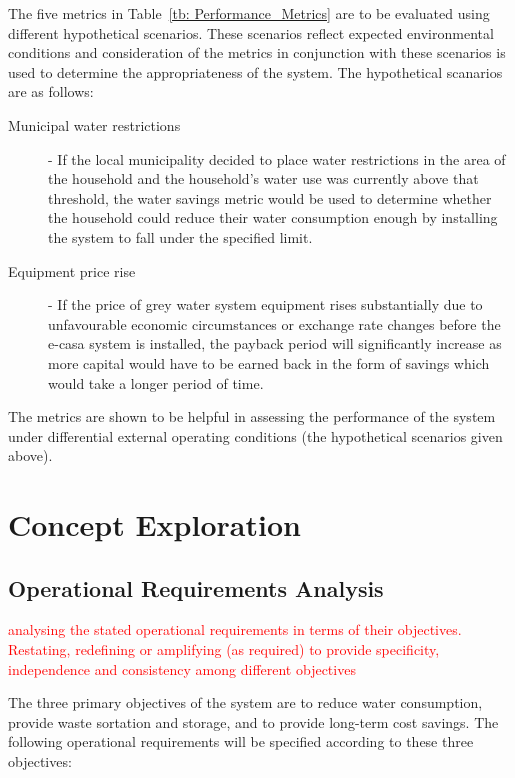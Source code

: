 \documentclass[a4paper,11pt,fleqn]{report}
\begin{document}
The five metrics in Table~\ref{tb: Performance_Metrics} are to be evaluated using different hypothetical scenarios. These scenarios reflect expected environmental conditions and consideration of the metrics in conjunction with these scenarios is used to determine the appropriateness of the system. The hypothetical scanarios are as follows:
%
\begin{description}
	\item[Municipal water restrictions] - If the local municipality decided to place water restrictions in the area of the household and the household's water use was currently above that threshold, the water savings metric would be used to determine whether the household could reduce their water consumption enough by installing the system to fall under the specified limit.
	\item[Equipment price rise] - If the price of grey water system equipment rises substantially due to unfavourable economic circumstances or exchange rate changes before the \ac{e-casa} system is installed, the payback period will significantly increase as more capital would have to be earned back in the form of savings which would take a longer period of time.
\end{description}

The metrics are shown to be helpful in assessing the performance of the system under differential external operating conditions (the hypothetical scenarios given above). 

\section{Concept Exploration}
\subsection{Operational Requirements Analysis}
\textcolor{red}{analysing the stated operational requirements in terms of their objectives. Restating, redefining or amplifying (as required) to provide specificity, independence and consistency among different objectives}

The three primary objectives of the system are to reduce water consumption, provide waste sortation and storage, and to provide long-term cost savings. The following operational requirements will be specified according to these three objectives: 
\end{document}
